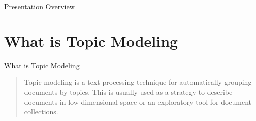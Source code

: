 \documentclass[10pt]{beamer}
\begin{document}
\begin{frame}{Presentation Overview}
  \tableofcontents

\end{frame}

\section{What is Topic Modeling}

\begin{frame}{What is Topic Modeling}
  \begin{quote}
    Topic modeling is a text processing technique for automatically grouping documents by topics. This is usually used as a strategy to describe documents in low dimensional space or an exploratory tool for document collections.
  \end{quote}
\end{frame}

\newcommand{\Food}[1]{\colorbox{orange!30}{#1}\xspace}
\newcommand{\Travel}[1]{\colorbox{blue!30}{#1}\xspace}
\newcommand{\Time}[1]{\colorbox{green!30}{#1}\xspace}
\newcommand{\Document}[1]{\fbox{\begin{minipage}{\columnwidth}#1\end{minipage}}}
\end{document}
